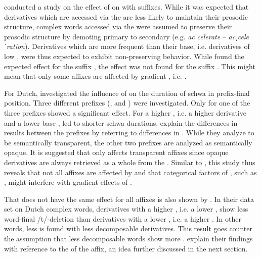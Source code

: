  \cite{Collie.2008} conducted a study on the effect of  on  with suffixes. While it was expected that derivatives which are accessed via the  are less likely to maintain their prosodic structure, complex words accessed via the  were assumed to preserve their prosodic structure by demoting primary  to secondary  (e.g. \textit{acˈcelerate} --  \textit{acˌceleˈration}). Derivatives which are more frequent than their base, i.e. derivatives of low , were thus expected to exhibit non-preserving behavior. While \cite{Collie.2008} found the expected effect for the suffix , the effect was not found for the suffix . This might mean that only some affixes are affected by gradient , i.e. .
 	
 For Dutch, \cite{Hanique.2011} investigated the influence of  on the duration of schwa in prefix-final position. Three different prefixes (,  and ) were investigated. Only for one of the three prefixes  showed a significant effect. For  a higher , i.e. a higher derivative  and a lower base , led to shorter schwa durations.
 \cite{Hanique.2011} explain the differences in results between the prefixes by referring to differences in . While they analyze  to be semantically transparent, the other two prefixes are analyzed as semantically opaque. It is suggested that  only affects transparent affixes since opaque derivatives are always  retrieved as a whole from the . Similar to \cite{Collie.2008}, this study thus reveals that not all affixes are affected by  and that categorical factors of , such as , might interfere with gradient effects of . 


That  does not have the same effect for all affixes is also shown by \cite{Schuppler.2012}. In their data set on Dutch complex words, derivatives with a higher , i.e. a lower , show less word-final /t/-deletion than derivatives with a lower , i.e. a higher . In other words, less  is found with less decomposable derivatives. This result goes counter the assumption that less decomposable words show more . \cite{Schuppler.2012} explain their findings with reference to the  of the affix, an idea further discussed in the next section.

